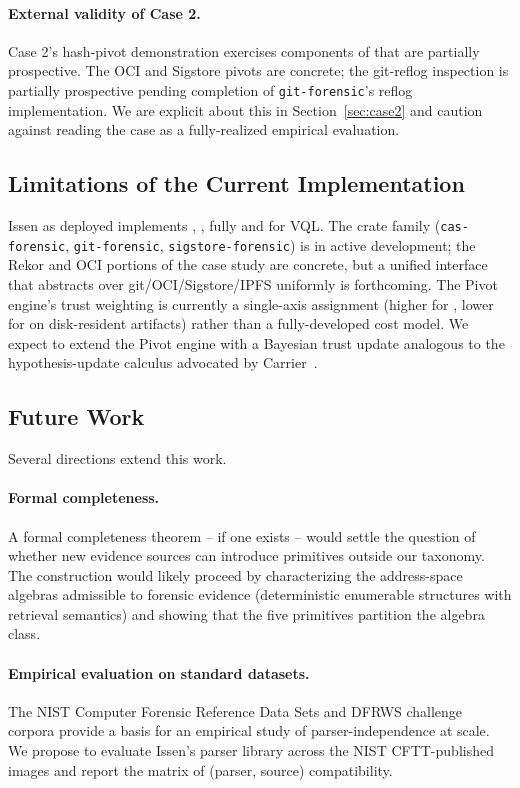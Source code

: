 \paragraph{External validity of Case 2.} Case 2's hash-pivot demonstration
exercises components of  that are partially prospective. The OCI and
Sigstore pivots are concrete; the git-reflog inspection is partially
prospective pending completion of \texttt{git-forensic}'s reflog
implementation. We are explicit about this in Section~\ref{sec:case2} and
caution against reading the case as a fully-realized empirical evaluation.

\subsection{Limitations of the Current Implementation}

Issen as deployed implements , ,  fully and 
for VQL. The  crate family (\texttt{cas-forensic},
\texttt{git-forensic}, \texttt{sigstore-forensic}) is in active development;
the Rekor and OCI portions of the case study are concrete, but a unified
 interface that abstracts over git/OCI/Sigstore/IPFS uniformly is
forthcoming. The Pivot engine's trust weighting is currently a single-axis
assignment (higher for , lower for  on disk-resident
artifacts) rather than a fully-developed cost model. We expect to extend
the Pivot engine with a Bayesian trust update analogous to the
hypothesis-update calculus advocated by
Carrier~\cite{carrier2006hypothesis}.

\subsection{Future Work}

Several directions extend this work.

\paragraph{Formal completeness.} A formal completeness theorem -- if one
exists -- would settle the question of whether new evidence sources can
introduce primitives outside our taxonomy. The construction would likely
proceed by characterizing the address-space algebras admissible to
forensic evidence (deterministic enumerable structures with retrieval
semantics) and showing that the five primitives partition the algebra
class.

\paragraph{Empirical evaluation on standard datasets.} The NIST Computer
Forensic Reference Data Sets and DFRWS challenge corpora provide a basis
for an empirical study of parser-independence at scale. We propose to
evaluate Issen's parser library across the NIST CFTT-published images and
report the matrix of (parser, source) compatibility.

